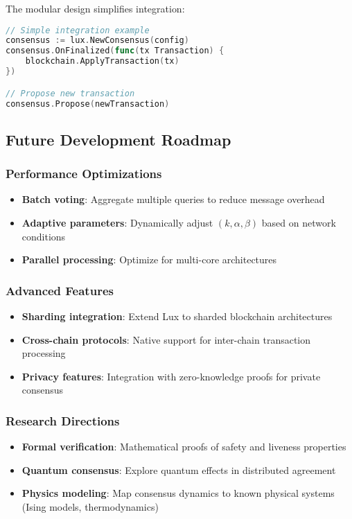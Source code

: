The modular design simplifies integration:
\begin{lstlisting}[language=Go]
// Simple integration example
consensus := lux.NewConsensus(config)
consensus.OnFinalized(func(tx Transaction) {
    blockchain.ApplyTransaction(tx)
})

// Propose new transaction
consensus.Propose(newTransaction)
\end{lstlisting}

\subsection{Future Development Roadmap}

\subsubsection{Performance Optimizations}

\begin{itemize}
\item \textbf{Batch voting}: Aggregate multiple queries to reduce message overhead
\item \textbf{Adaptive parameters}: Dynamically adjust $(k, \alpha, \beta)$ based on network conditions
\item \textbf{Parallel processing}: Optimize for multi-core architectures
\end{itemize}

\subsubsection{Advanced Features}

\begin{itemize}
\item \textbf{Sharding integration}: Extend Lux to sharded blockchain architectures
\item \textbf{Cross-chain protocols}: Native support for inter-chain transaction processing
\item \textbf{Privacy features}: Integration with zero-knowledge proofs for private consensus
\end{itemize}

\subsubsection{Research Directions}

\begin{itemize}
\item \textbf{Formal verification}: Mathematical proofs of safety and liveness properties
\item \textbf{Quantum consensus}: Explore quantum effects in distributed agreement
\item \textbf{Physics modeling}: Map consensus dynamics to known physical systems (Ising models, thermodynamics)
\end{itemize}